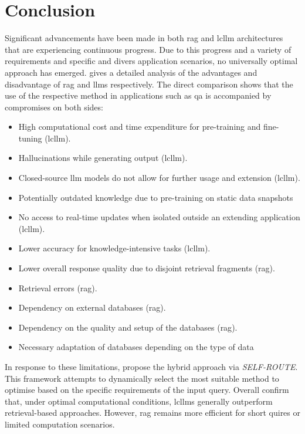 \section{Conclusion}
Significant advancements have been made in both \ac{rag} and \ac{lcllm} architectures that are experiencing continuous progress.
Due to this progress and a variety of requirements and specific and divers application scenarios, no universally optimal approach has emerged.
\citet{Li2024RetrievalAG} gives a detailed analysis of the advantages and disadvantage of \ac{rag} and \acp{llm} respectively.
The direct comparison shows that the use of the respective method in applications such as \ac{qa} is accompanied by compromises on both sides:
\begin{itemize}
    \item High computational cost and time expenditure for pre-training and fine-tuning (\ac{lcllm}).
    \item Hallucinations while generating output (\ac{lcllm}).
    \item Closed-source \ac{llm} models do not allow for further usage and extension (\ac{lcllm}).
    \item Potentially outdated knowledge due to pre-training on static data snapshots 
    \item No access to real-time updates when isolated outside an extending application (\ac{lcllm}).
    \item Lower accuracy for knowledge-intensive tasks (\ac{lcllm}).
    \item Lower overall response quality due to disjoint retrieval fragments (\ac{rag}).
    \item Retrieval errors (\ac{rag}).
    \item Dependency on external databases (\ac{rag}).
    \item Dependency on the quality and setup of the databases (\ac{rag}).
    \item Necessary adaptation of databases depending on the type of data
\end{itemize}
%
In response to these limitations, \citet{Li2024RetrievalAG} propose the hybrid approach via \textit{SELF-ROUTE}.
This framework attempts to dynamically select the most suitable method to optimise based on the specific requirements of the input query.
%
Overall \citet{Li2024RetrievalAG} confirm that, under optimal computational conditions, \acp{lcllm} generally outperform retrieval-based approaches.
However, \ac{rag} remains more efficient for short quires or limited computation scenarios.
%
